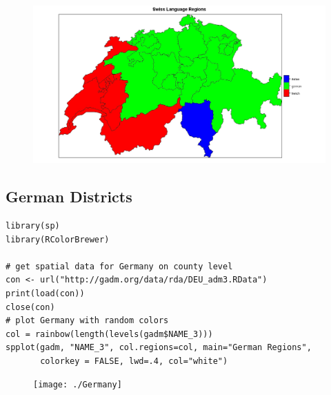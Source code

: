 \documentclass[]{article}
\begin{document}
\begin{figure}[h!]
\centering
\includegraphics[width=0.96\linewidth]{./SwissLang}
\caption{}
\label{fig:SwissLang}
\end{figure}

\newpage
\subsection*{German Districts}
\begin{framed}
\begin{verbatim}
library(sp)
library(RColorBrewer)

# get spatial data for Germany on county level
con <- url("http://gadm.org/data/rda/DEU_adm3.RData")
print(load(con))
close(con)
# plot Germany with random colors
col = rainbow(length(levels(gadm$NAME_3)))
spplot(gadm, "NAME_3", col.regions=col, main="German Regions",
       colorkey = FALSE, lwd=.4, col="white")
\end{verbatim}
\end{framed}       

\begin{figure}
\centering
\texttt{[image: ./Germany]}
\caption{}
\label{fig:Germany}
\end{figure}
\end{document}
